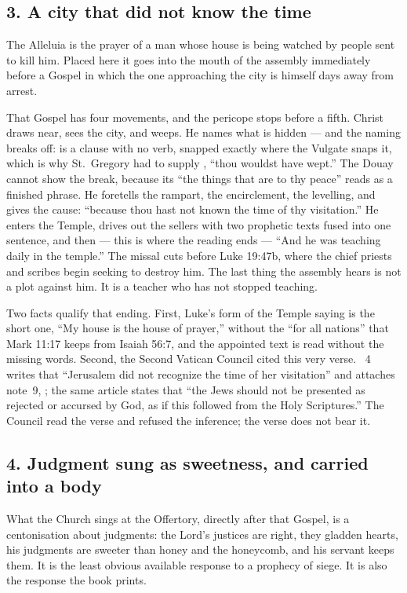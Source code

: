 \subsection*{3. A city that did not know the time}

The Alleluia is the prayer of a man whose house is being watched by people
sent to kill him. Placed here it goes into the mouth of the assembly
immediately before a Gospel in which the one approaching the city is himself
days away from arrest.

That Gospel has four movements, and the pericope stops before a fifth. Christ
draws near, sees the city, and weeps. He names what is hidden --- and the
naming breaks off:  is a clause with no verb, snapped
exactly where the Vulgate snaps it, which is why St.~Gregory had to supply
, ``thou wouldst have wept.'' The Douay cannot show the break,
because its ``the things that are to thy peace'' reads as a finished
phrase. He foretells the rampart, the encirclement, the levelling, and gives
the cause: ``because thou hast not known the time of thy visitation.'' He
enters the Temple, drives out the sellers with two prophetic texts fused into
one sentence, and then --- this is where the reading ends --- ``And he was
teaching daily in the temple.'' The missal cuts before Luke 19:47b, where the
chief priests and scribes begin seeking to destroy him. The last thing the
assembly hears is not a plot against him. It is a teacher who has not stopped
teaching.

Two facts qualify that ending. First, Luke's form of
the Temple saying is the short one, ``My house is the house of prayer,''
without the ``for all nations'' that Mark 11:17 keeps from Isaiah 56:7, and
the appointed text is read without the missing words. Second, the Second Vatican Council
cited this very verse. ~4 writes that ``Jerusalem did not
recognize the time of her visitation'' and attaches note~9, ; the same article states that ``the Jews should not be presented as
rejected or accursed by God, as if this followed from the Holy Scriptures.''
The Council read the verse and refused the inference; the verse does not
bear it.

\subsection*{4. Judgment sung as sweetness, and carried into a body}

What the Church sings at the Offertory, directly after that Gospel, is a
centonisation about judgments: the Lord's justices are right, they gladden
hearts, his judgments are sweeter than honey and the honeycomb, and his
servant keeps them. It is the least obvious available response to a prophecy
of siege. It is also the response the book prints.

